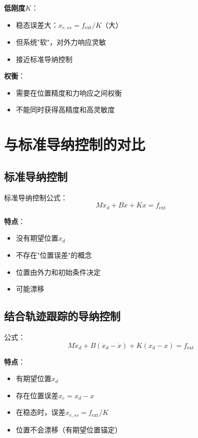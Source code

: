 \documentclass[12pt,a4paper]{article}
\begin{document}
\textbf{低刚度$K$}：
\begin{itemize}
\item 稳态误差大：$x_{e,ss} = f_{\text{ext}}/K$（大）
\item 但系统"软"，对外力响应灵敏
\item 接近标准导纳控制
\end{itemize}

\textbf{权衡}：
\begin{itemize}
\item 需要在位置精度和力响应之间权衡
\item 不能同时获得高精度和高灵敏度
\end{itemize}

\section{与标准导纳控制的对比}

\subsection{标准导纳控制}

标准导纳控制公式：
\begin{equation}
M\ddot{x}_d + B\dot{x} + Kx = f_{\text{ext}}
\end{equation}

\textbf{特点}：
\begin{itemize}
\item 没有期望位置$x_d$
\item 不存在"位置误差"的概念
\item 位置由外力和初始条件决定
\item 可能漂移
\end{itemize}

\subsection{结合轨迹跟踪的导纳控制}

公式：
\begin{equation}
M\ddot{x}_d + B(\dot{x}_d - \dot{x}) + K(x_d - x) = f_{\text{ext}}
\end{equation}

\textbf{特点}：
\begin{itemize}
\item 有期望位置$x_d$
\item 存在位置误差$x_e = x_d - x$
\item 在稳态时，误差$x_{e,ss} = f_{\text{ext}}/K$
\item 位置不会漂移（有期望位置锚定）
\end{itemize}
\end{document}
